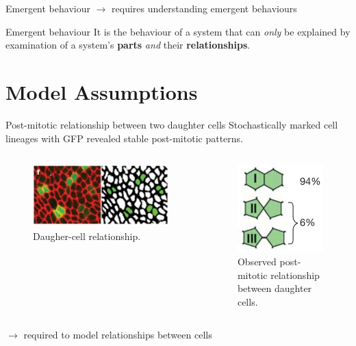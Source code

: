 \documentclass[aspectratio=169, 10pt]{beamer}
\begin{document}
\begin{frame}[fragile]{Emergent behaviour}  
    $\rightarrow$ requires understanding emergent behaviours
    \begin{alertblock}{Emergent behaviour}
        \vspace{5pt}
        It is the behaviour of a system that can \emph{only} be explained by examination of a system's \textbf{parts} \emph{and} their \textbf{relationships}.
    \end{alertblock}
\end{frame}

\section{Model Assumptions}

\begin{frame}[fragile]{Post-mitotic relationship between two daughter cells}
  Stochastically marked cell lineages with GFP revealed stable post-mitotic patterns.     
  \begin{columns}[]
    \begin{figure}[b]
      \centering
      \includegraphics[width=\textwidth]{presentation/figures/daughter-cell-relationship.png}
      \caption{Daugher-cell relationship.}
      \label{}
    \end{figure}
        \begin{figure}[b]
            \centering
            \includegraphics[width=.4\textwidth]{presentation/figures/post-mitotic-relationship.png}
            \caption{Observed post-mitotic relationship between daughter cells.}
            \label{}
    \end{figure}
  \end{columns}  
  $\rightarrow$ required to model relationships between cells
\end{frame}
\end{document}
